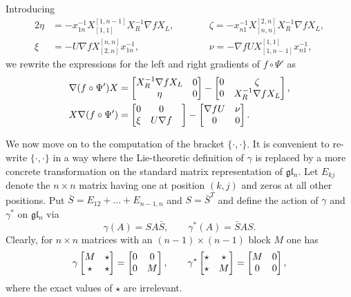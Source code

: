\documentclass{amsart}
\theoremstyle{definition}
\theoremstyle{remark}
\numberwithin{equation}{section}
\numberwithin{theorem}{section}
\def\nablac{{\nabla}}
\def\gl{\mathfrak g\mathfrak l}
\def\Poi{{\{{\cdot},{\cdot}\}}}
\begin{document}
Introducing
\begin{alignat*}{2}
\eta&=-x_{1n}^{-1}X_{[1,1]}^{[1,n-1]}X_R^{-1}\nablac f X_L, \qquad 
&&\zeta=-x_{n1}^{-1}X_{[n,n]}^{[2,n]}X_R^{-1}\nablac f X_L,\\
\xi&=-U\nablac f X_{[2,n]}^{[n,n]}x_{1n}^{-1}, \qquad 
&&\nu=-\nablac f U X^{[1,1]}_{[1,n-1]}x_{n1}^{-1},
\end{alignat*}
we rewrite the expressions for the left and right gradients of $f\circ\Psi'$ as
\begin{equation}\label{leftrightgrad}
\begin{aligned}
\nabla(f\circ\Psi') X&=\begin{bmatrix} X_R^{-1}\nablac f X_L &0\cr \eta&0\end{bmatrix}
-\begin{bmatrix}0&\zeta\cr 0 &X_R^{-1}\nablac f X_L\end{bmatrix},\\
X\nabla(f\circ\Psi')&=\begin{bmatrix}0& 0 &\cr \xi& U\nablac f\end{bmatrix}
-\begin{bmatrix}\nablac fU&\nu\cr 0&0\end{bmatrix}.
\end{aligned}
\end{equation}

We now move on to the computation of the bracket $\Poi$.  It is convenient to re-write $\Poi$ in a way where the Lie-theoretic definition of $\gamma$ is replaced by a more concrete transformation on the standard matrix
representation of 
$\gl_n$. Let $E_{kj}$ denote the $n\times n$ matrix having one at position $(k,j)$ and zeros at all other positions. Put $\bar S=E_{12}+\dots+E_{n-1,n}$ and $S=\bar S^T$
and define the action of $\gamma$ and $\gamma^*$ on $\gl_n$ via
\[
\gamma(A)=SA\bar S,\qquad \gamma^*(A)=\bar SAS.
\]
Clearly, for $n\times n$ matrices with an $(n-1)\times(n-1)$ block $M$ one has
\[ 
\gamma\begin{bmatrix} M&\star\cr \star &\star\end{bmatrix}=\begin{bmatrix} 0&0\cr 0 &M\end{bmatrix},\qquad
\gamma^*\begin{bmatrix} \star&\star\cr \star &M\end{bmatrix}=\begin{bmatrix} M&0\cr 0 &0\end{bmatrix},
\]
where the exact values of $\star$ are irrelevant.
\end{document}
